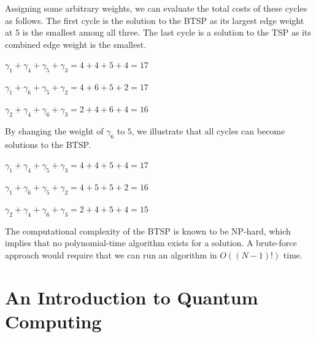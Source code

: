 \documentclass[msc,oneside]{ubcthesis}
\begin{document}
Assigning some arbitrary weights, we can evaluate the total costs of these cycles as follows. The first cycle is the solution to the BTSP as its largest edge weight at $5$ is the smallest among all three. The last cycle is a solution to the TSP as its combined edge weight is the smallest.
\begin{center}
	$\gamma_1 + \gamma_4 + \gamma_5 + \gamma_3 = 4 + 4 + 5 + 4 = 17$
	
	$ \gamma_1 + \gamma_6 + \gamma_5 + \gamma_2 = 4 + 6 + 5 + 2 = 17$
	
	$  \gamma_2 + \gamma_4 + \gamma_6 + \gamma_3 = 2 + 4 + 6 + 4 = 16$
\end{center}


By changing the weight of $\gamma_6$ to $5$, we illustrate that all cycles can become solutions to the BTSP. 

\begin{center}
	
	$\gamma_1 + \gamma_4 + \gamma_5 + \gamma_3 = 4 + 4 + 5 + 4 = 17$
	
	$ \gamma_1 + \gamma_6 + \gamma_5 + \gamma_2 = 4 + 5 + 5 + 2 = 16$
	
	$  \gamma_2 + \gamma_4 + \gamma_6 + \gamma_3 = 2 + 4 + 5 + 4 = 15$
\end{center}

The computational complexity of the BTSP is known to be NP-hard, which implies that no polynomial-time algorithm exists for a solution. A brute-force approach would require that we can run an algorithm in $O((N-1)!)$ time.

	\section{An Introduction to Quantum Computing}
	
\end{document}
